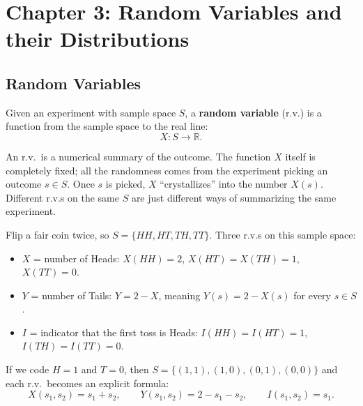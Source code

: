 \section[Random Variables and their Distributions]{Chapter 3: Random Variables and their Distributions}

\subsection{Random Variables}

\bigskip

\begin{definition}\label{def:rv}
Given an experiment with sample space $S$, a \textbf{random variable} (r.v.) is a function from the sample space to the real line:
\medskip
\[X : S \to \mathbb{R}.\]
\end{definition}

\bigskip

\begin{intuition}
An r.v.\ is a numerical summary of the outcome. The function $X$ itself is completely fixed; all the randomness comes from the experiment picking an outcome $s \in S$. Once $s$ is picked, $X$ ``crystallizes'' into the number $X(s)$. Different r.v.s on the same $S$ are just different ways of summarizing the same experiment.
\end{intuition}

\bigskip

\begin{example}\label{ex:cointoss}
Flip a fair coin twice, so $S = \{HH, HT, TH, TT\}$. Three r.v.s on this sample space:
\medskip
\begin{itemize}
  \setlength{\itemsep}{0.4em}
  \item $X$ = number of Heads: $X(HH) = 2$, $X(HT) = X(TH) = 1$, $X(TT) = 0$.
  \item $Y$ = number of Tails: $Y = 2 - X$, meaning $Y(s) = 2 - X(s)$ for every $s \in S$.
  \item $I$ = indicator that the first toss is Heads: $I(HH) = I(HT) = 1$, $I(TH) = I(TT) = 0$.
\end{itemize}
\medskip
If we code $H = 1$ and $T = 0$, then $S = \{(1,1), (1,0), (0,1), (0,0)\}$ and each r.v.\ becomes an explicit formula:
\medskip
\[
X(s_1, s_2) = s_1 + s_2,
\qquad
Y(s_1, s_2) = 2 - s_1 - s_2,
\qquad
I(s_1, s_2) = s_1.
\]
\end{example}


